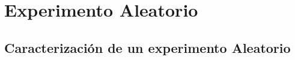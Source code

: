 \section{Experimento Aleatorio}
    \lipsum
    \subsection{Caracterización de un experimento Aleatorio}
        \lipsum 